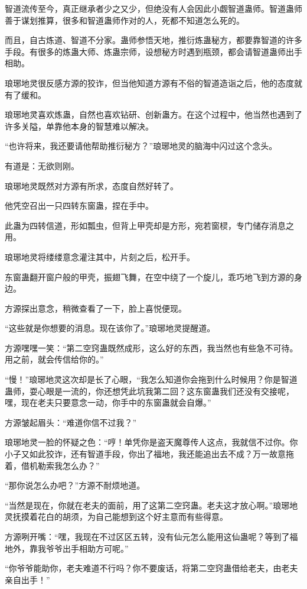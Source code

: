 \begin{this_body}
智道流传至今，真正继承者少之又少，但绝没有人会因此小觑智道蛊师。智道蛊师善于谋划推算，很多和智道蛊师作对的人，死都不知道怎么死的。

而且，自古炼道、智道不分家。蛊师参悟天地，推衍炼蛊秘方，都要靠智道的许多手段。有很多的炼蛊大师、炼蛊宗师，设想秘方时遇到瓶颈，都会请智道蛊师出手相助。

琅琊地灵很反感方源的狡诈，但当他知道方源有不俗的智道造诣之后，他的态度就有了缓和。

琅琊地灵喜欢炼蛊，自然也喜欢钻研、创新蛊方。在这个过程中，他当然也遇到了许多关隘，单靠他本身的智慧难以解决。

“也许将来，我还要请他帮助推衍秘方？”琅琊地灵的脑海中闪过这个念头。

有道是：无欲则刚。

琅琊地灵既然对方源有所求，态度自然好转了。

他凭空召出一只四转东窗蛊，捏在手中。

此蛊为四转信道，形如瓢虫，但背上甲壳却是方形，宛若窗棂，专门储存消息之用。

琅琊地灵将缕缕意念灌注其中，片刻之后，松开手。

东窗蛊翻开窗户般的甲壳，振翅飞舞，在空中绕了一个旋儿，乖巧地飞到方源的身边。

方源探出意念，稍微查看了一下，脸上喜悦便现。

“这些就是你想要的消息。现在该你了。”琅琊地灵提醒道。

方源嘿嘿一笑：“第二空窍蛊既然成形，这么好的东西，我当然也有些急不可待。用之前，就会传信给你的。”

“慢！”琅琊地灵这次却是长了心眼，“我怎么知道你会拖到什么时候用？你是智道蛊师，耍心眼是一流的，你还想凭此坑我第二回？这东窗蛊我们还没有交接呢，嘿，现在老夫只要意念一动，你手中的东窗蛊就会自爆。”

方源皱起眉头：“难道你信不过我？”

琅琊地灵一脸的怀疑之色：“哼！单凭你是盗天魔尊传人这点，我就信不过你。你小子又如此狡诈，还有智道手段，你出了福地，我还能追出去不成？万一故意拖着，借机勒索我怎么办？”

“那你说怎么办吧？”方源不耐烦地道。

“当然是现在，你就在老夫的面前，用了这第二空窍蛊。老夫这才放心啊。”琅琊地灵抚摸着花白的胡须，为自己能想到这个好主意而有些得意。

方源咧开嘴：“嘿，我现在不过区区五转，没有仙元怎么能用这仙蛊呢？等到了福地外，靠我爷爷出手相助方可呢。”

“你爷爷能助你，老夫难道不行吗？你不要废话，将第二空窍蛊借给老夫，由老夫亲自出手！”


\end{this_body}

